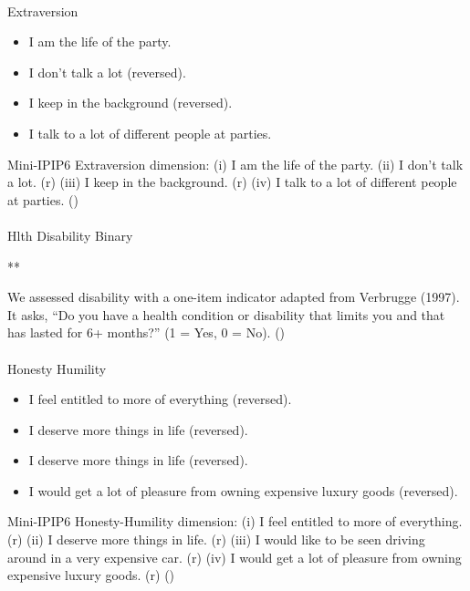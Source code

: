 \documentclass[
  single column]{article}
\makeatletter
\let\oldparagraph\paragraph
\renewcommand{\paragraph}{
    \@ifstar
      \xxxParagraphStar
      \xxxParagraphNoStar
  }
\newcommand{\xxxParagraphStar}[1]{\oldparagraph*{#1}\mbox{}}
\newcommand{\xxxParagraphNoStar}[1]{\oldparagraph{#1}\mbox{}}
\providecommand{\tightlist}{%
  \setlength{\itemsep}{0pt}\setlength{\parskip}{0pt}}\usepackage{longtable,booktabs,array}
\makeatother
\begin{document}
\paragraph{Extraversion}\label{extraversion}

\begin{itemize}
\tightlist
\item
  I am the life of the party.
\item
  I don't talk a lot (reversed).
\item
  I keep in the background (reversed).
\item
  I talk to a lot of different people at parties.
\end{itemize}

Mini-IPIP6 Extraversion dimension: (i) I am the life of the party. (ii)
I don't talk a lot. (r) (iii) I keep in the background. (r) (iv) I talk
to a lot of different people at parties.
()

\paragraph{Hlth Disability Binary}\label{hlth-disability-binary}

**

We assessed disability with a one-item indicator adapted from Verbrugge
(1997). It asks, ``Do you have a health condition or disability that
limits you and that has lasted for 6+ months?'' (1 = Yes, 0 = No).
()

\paragraph{Honesty Humility}\label{honesty-humility}

\begin{itemize}
\tightlist
\item
  I feel entitled to more of everything (reversed).
\item
  I deserve more things in life (reversed).
\item
  I deserve more things in life (reversed).
\item
  I would get a lot of pleasure from owning expensive luxury goods
  (reversed).
\end{itemize}

Mini-IPIP6 Honesty-Humility dimension: (i) I feel entitled to more of
everything. (r) (ii) I deserve more things in life. (r) (iii) I would
like to be seen driving around in a very expensive car. (r) (iv) I would
get a lot of pleasure from owning expensive luxury goods. (r)
()
\end{document}
